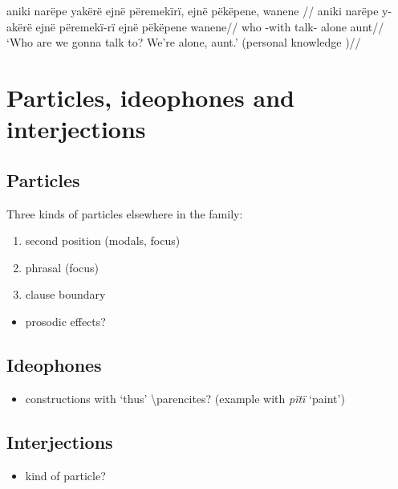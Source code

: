\documentclass{memoir}
\begin{document}
\ex \label{convrisamaj-47}
\begingl \glpreamble aniki narëpe yakërë ejnë përemekïrï, ejnë pëkëpene, wanene //
\gla aniki narëpe y-akërë ejnë përemekï-rï ejnë pëkëpene wanene//
\glb who  -with  talk-  alone aunt//
\glft ‘Who are we gonna talk to? We’re alone, aunt.’ (personal knowledge
)//
\endgl
\xe

\chapter{\texorpdfstring{Particles, ideophones and interjections
\label{partideo}}{Particles, ideophones and interjections }}

\section{Particles}

Three kinds of particles elsewhere in the family:

\begin{enumerate}
\def\labelenumi{\arabic{enumi}.}
\tightlist
\item
  second position (modals, focus)
\item
  phrasal (focus)
\item
  clause boundary
\end{enumerate}

\begin{itemize}
\tightlist
\item
  prosodic effects?
\end{itemize}

\section{Ideophones}

\begin{itemize}
\tightlist
\item
  constructions with  `thus' \textbackslash parencites?
  (example with \emph{pïtï} `paint')
\end{itemize}

\section{Interjections}

\begin{itemize}
\tightlist
\item
  kind of particle?
\end{itemize}
\end{document}
